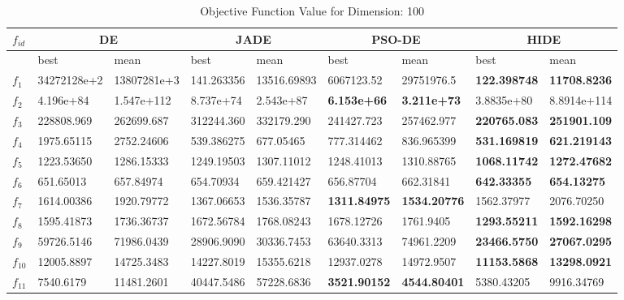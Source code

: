 \begin{table*}[h!]
\centering
\caption{Objective Function Value for Dimension: 100}
 \begin{tabular}{|p{0.8cm}|p{1.6cm}|p{1.6cm}|p{1.6cm}|p{1.6cm}|p{1.6cm}|p{1.6cm}|p{1.6cm}|p{1.6cm}|} 
\hline
$f_{id}$ & \multicolumn{2}{c|}{DE} & \multicolumn{2}{c|}{JADE} & \multicolumn{2}{c|}{PSO-DE} & \multicolumn{2}{c|}{HIDE} \\
\hline
    & best & mean & best & mean & best & mean & best & mean \\ [0.5ex] 
\hline
$f_{1}$  & 34272128e+2 & 13807281e+3 & 141.263356 & 13516.69893 & 6067123.52 & 29751976.5 & \textbf{122.398748} & \textbf{11708.8236} \\ 
$f_{2}$  & 4.196e+84 & 1.547e+112 & 8.737e+74 & 2.543e+87 & \textbf{6.153e+66} & \textbf{3.211e+73} & 3.8835e+80 & 8.8914e+114 \\ 
$f_{3}$  & 228808.969 & 262699.687 & 312244.360 & 332179.290 & 241427.723 & 257462.977 & \textbf{220765.083} & \textbf{251901.109} \\ 
$f_{4}$  & 1975.65115 & 2752.24606 & 539.386275 & 677.05465 & 777.314462 & 836.965399 & \textbf{531.169819} & \textbf{621.219143} \\ 
$f_{5}$  & 1223.53650 & 1286.15333 & 1249.19503 & 1307.11012 & 1248.41013 & 1310.88765 & \textbf{1068.11742} & \textbf{1272.47682} \\ 
$f_{6}$  & 651.65013 & 657.84974 & 654.70934 & 659.421427 & 656.87704 & 662.31841 & \textbf{642.33355} & \textbf{654.13275} \\ 
$f_{7}$  & 1614.00386 & 1920.79772 & 1367.06653 & 1536.35787 & \textbf{1311.84975} & \textbf{1534.20776} & 1562.37977 & 2076.70250 \\ 
$f_{8}$  & 1595.41873 & 1736.36737 & 1672.56784 & 1768.08243 & 1678.12726 & 1761.9405 & \textbf{1293.55211} & \textbf{1592.16298} \\ 
$f_{9}$  & 59726.5146 & 71986.0439 & 28906.9090 & 30336.7453 & 63640.3313 & 74961.2209 & \textbf{23466.5750} & \textbf{27067.0295} \\ 
$f_{10}$  & 12005.8897 & 14725.3483 & 14227.8019 & 15355.6218 & 12937.0278 & 14972.9507 & \textbf{11153.5868} & \textbf{13298.0921} \\ 
$f_{11}$  & 7540.6179 & 11481.2601 & 40447.5486 & 57228.6836 & \textbf{3521.90152} & \textbf{4544.80401} & 5380.43205 & 9916.34769 \\ 

\end{tabular}
\end{table*}
